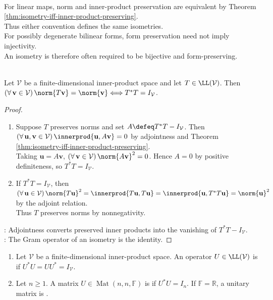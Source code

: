 \begin{remark} \label{rem:isometry-conventions} \\
For linear maps, norm and inner-product preservation are equivalent by Theorem \ref{thm:isometry-iff-inner-product-preserving}.\\
Thus either convention defines the same isometries.\\
For possibly degenerate bilinear forms, form preservation need not imply injectivity.\\
An isometry is therefore often required to be bijective and form-preserving.
\end{remark}

\begin{theorem} \label{thm:finite-dimensional-isometry-iff-adjoint-product-identity} \\
Let $\mathcal{V}$ be a finite-dimensional inner-product space and let $T\in\LL(\mathcal{V})$. Then $(\forall\,\mathbf{v}\in\mathcal{V})\,\norm{T\mathbf{v}}=\norm{\mathbf{v}}\Longleftrightarrow T^*T=I_{\mathcal{V}}$.
\begin{proof}
\begin{enumerate}[label=\roman*.]
\setlength{\itemsep}{0pt}
\item[$(\Rightarrow)$] Suppose $T$ preserves norms and set $A\defeq T^*T-I_{\mathcal{V}}$. Then $(\forall\,\mathbf{u},\mathbf{v}\in\mathcal{V})\,\innerprod{\mathbf{u},A\mathbf{v}}=0$ by adjointness and Theorem \ref{thm:isometry-iff-inner-product-preserving}.\\
Taking $\mathbf{u}=A\mathbf{v}$, $(\forall\,\mathbf{v}\in\mathcal{V})\,\norm{A\mathbf{v}}^2=0$. Hence $A=0$ by positive definiteness, so $T^*T=I_{\mathcal{V}}$.
\item[$(\Leftarrow)$] If $T^*T=I_{\mathcal{V}}$, then $(\forall\,\mathbf{u}\in\mathcal{V})\,\norm{T\mathbf{u}}^2=\innerprod{T\mathbf{u},T\mathbf{u}}=\innerprod{\mathbf{u},T^*T\mathbf{u}}=\norm{\mathbf{u}}^2$ by the adjoint relation.\\
Thus $T$ preserves norms by nonnegativity.
\end{enumerate}
: Adjointness converts preserved inner products into the vanishing of $T^*T-I_{\mathcal{V}}$.\\
: The Gram operator of an isometry is the identity.
\end{proof}
\end{theorem}

\begin{definition} \label{def:unitary-operator-and-matrix} 
\begin{enumerate}[label=(\roman*)]
\setlength{\itemsep}{0pt}
\item Let $\mathcal{V}$ be a finite-dimensional inner-product space. An operator $U\in\LL(\mathcal{V})$ is  if $U^*U=UU^*=I_{\mathcal{V}}$.
\item Let $n\geq1$. A matrix $U\in\operatorname{Mat}(n,n,\mathbb{F})$ is  if $U^*U=I_n$. If $\mathbb{F}=\mathbb{R}$, a unitary matrix is .
\end{enumerate}
\end{definition}

